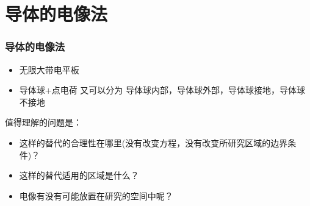\documentclass[10pt]{beamer}
\begin{document}
\section{导体的电像法}
\begin{frame}
    \frametitle{导体的电像法}
    \begin{itemize}
        \item 无限大带电平板
        \item 导体球+点电荷 \quad 又可以分为 导体球内部，导体球外部，导体球接地，导体球不接地
    \end{itemize}
    值得理解的问题是：
    \begin{itemize}
        \item 这样的替代的合理性在哪里(没有改变方程，没有改变所研究区域的边界条件)？
        \item 这样的替代适用的区域是什么？
        \item 电像有没有可能放置在研究的空间中呢？
    \end{itemize}
\end{frame}
\end{document}

